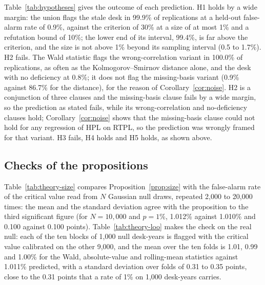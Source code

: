 Table~\ref{tab:hypotheses} gives the outcome of each prediction.
H1 holds by a wide margin: the union flags the stale desk in 99.9\% of replications at a held-out false-alarm rate of 0.9\%, against the criterion of 30\% at a size of at most 1\% and a refutation bound of 10\%; the lower end of its interval, 99.4\%, is far above the criterion, and the size is not above 1\% beyond its sampling interval (0.5 to 1.7\%).
H2 fails.
The Wald statistic flags the wrong-correlation variant in 100.0\% of replications, as often as the Kolmogorov--Smirnov distance alone, and the desk with no deficiency at 0.8\%; it does not flag the missing-basis variant (0.9\% against 86.7\% for the distance), for the reason of Corollary~\ref{cor:noise}.
H2 is a conjunction of three clauses and the missing-basis clause fails by a wide margin, so the prediction as stated fails, while its wrong-correlation and no-deficiency clauses hold; Corollary~\ref{cor:noise} shows that the missing-basis clause could not hold for any regression of HPL on RTPL, so the prediction was wrongly framed for that variant.
H3 fails, H4 holds and H5 holds, as shown above.



\subsection{Checks of the propositions}
\label{sec:results-theory}

Table~\ref{tab:theory-size} compares Proposition~\ref{prop:size} with the false-alarm rate of the critical value read from $N$ Gaussian null draws, repeated 2,000 to 20,000 times: the mean and the standard deviation agree with the proposition to the third significant figure (for $N=10{,}000$ and $p=1\%$, 1.012\% against 1.010\% and 0.100 against 0.100 points).
Table~\ref{tab:theory-loo} makes the check on the real null: each of the ten blocks of 1,000 null desk-years is flagged with the critical value calibrated on the other 9,000, and the mean over the ten folds is 1.01, 0.99 and 1.00\% for the Wald, absolute-value and rolling-mean statistics against 1.011\% predicted, with a standard deviation over folds of 0.31 to 0.35 points, close to the 0.31 points that a rate of 1\% on 1,000 desk-years carries.






